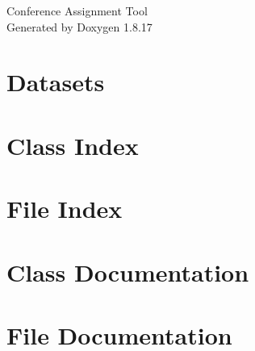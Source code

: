 \let\mypdfximage\pdfximage\def\pdfximage{\immediate\mypdfximage}\documentclass[twoside]{book}
\newcommand{\+}{\discretionary{\mbox{\scriptsize$\hookleftarrow$}}{}{}}
\newcommand{\clearemptydoublepage}{%
  \newpage{\pagestyle{empty}\cleardoublepage}%
}
\begin{document}
\hypersetup{pageanchor=false,
             bookmarksnumbered=true,
             pdfencoding=unicode
            }
\begin{titlepage}
\vspace*{7cm}
\begin{center}%
{\Large Conference Assignment Tool }\\
\vspace*{1cm}
{\large Generated by Doxygen 1.8.17}\\
\end{center}
\end{titlepage}
\clearemptydoublepage
{}
\tableofcontents
\clearemptydoublepage
{}
\hypersetup{pageanchor=true}

\chapter{Datasets}
\label{md_Project1SampleDatasets_README}

\chapter{Class Index}

\chapter{File Index}

\chapter{Class Documentation}










\chapter{File Documentation}



















\backmatter
\newpage
{}
\clearemptydoublepage
{}
\printindex
\end{document}

